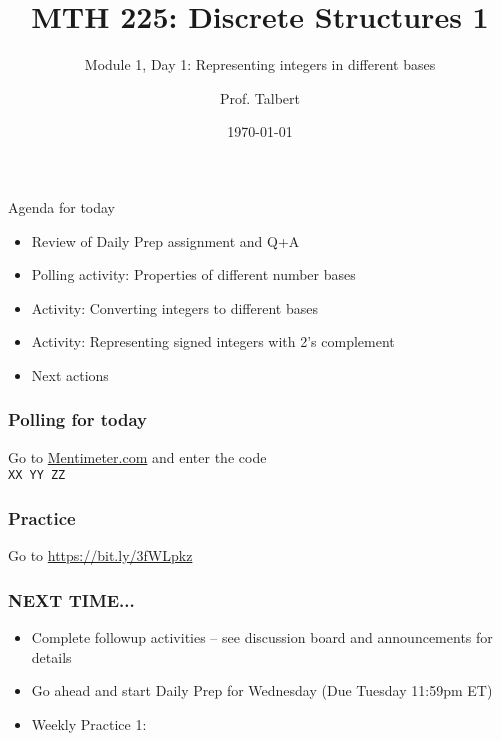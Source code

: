 \documentclass{beamer}
\title{MTH 225: Discrete Structures 1}
\subtitle{Module 1, Day 1: Representing integers in different bases}
\author{Prof. Talbert}
\institute{GVSU}
\date{\today}
\begin{document}
\frame{\titlepage}


\begin{frame}{Agenda for today}
    \begin{itemize}
        \item<1-> Review of Daily Prep assignment and Q+A
        \item<2-> Polling activity: Properties of different number bases
        \item<3-> Activity: Converting integers to different bases
        \item<4-> Activity: Representing signed integers with 2's complement
        \item<5-> Next actions 
    \end{itemize}
\end{frame}

\begin{frame}
    \frametitle{Polling for today}
    \begin{Large}
        \begin{center}
            Go to \url{Mentimeter.com} and enter the code \\ 
            \texttt{XX YY ZZ} 
        \end{center}   
    \end{Large}
\end{frame}

\begin{frame}
    \frametitle{Practice}

    \begin{Large}
        \begin{center}
            Go to \url{https://bit.ly/3fWLpkz}
        \end{center}   
    \end{Large}

\end{frame}


   

        



\begin{frame}
    \frametitle{NEXT TIME...}

    \begin{itemize}
        \item Complete followup activities -- see discussion board and announcements for details 
        \item Go ahead and start Daily Prep for Wednesday (Due Tuesday 11:59pm ET)
        \item Weekly Practice 1: 
    \end{itemize}

\end{frame}
\end{document}
